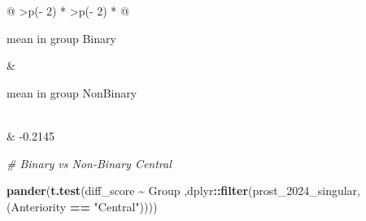 \documentclass[
]{article}
\newenvironment{Shaded}{\begin{snugshade}}{\end{snugshade}}
\newcommand{\CommentTok}[1]{\textcolor[rgb]{0.56,0.35,0.01}{\textit{#1}}}
\newcommand{\FunctionTok}[1]{\textcolor[rgb]{0.13,0.29,0.53}{\textbf{#1}}}
\newcommand{\NormalTok}[1]{#1}
\newcommand{\SpecialCharTok}[1]{\textcolor[rgb]{0.81,0.36,0.00}{\textbf{#1}}}
\newcommand{\StringTok}[1]{\textcolor[rgb]{0.31,0.60,0.02}{#1}}
\begin{document}
\begin{longtable}[]{@{}
  >{\centering\arraybackslash}p{(\columnwidth - 2\tabcolsep) * }
  >{\centering\arraybackslash}p{(\columnwidth - 2\tabcolsep) * }@{}}
\toprule\noalign{}
\begin{minipage}[b]{\linewidth}\centering
mean in group Binary
\end{minipage} & \begin{minipage}[b]{\linewidth}\centering
mean in group NonBinary
\end{minipage} \\
\midrule\noalign{}
\endhead
\bottomrule\noalign{}
 & -0.2145 \\
\end{longtable}

\begin{Shaded}
\begin{Highlighting}[]
\CommentTok{\# Binary vs Non{-}Binary Central}

\FunctionTok{pander}\NormalTok{(}\FunctionTok{t.test}\NormalTok{(diff\_score }\SpecialCharTok{\textasciitilde{}}\NormalTok{ Group}
\NormalTok{       ,dplyr}\SpecialCharTok{::}\FunctionTok{filter}\NormalTok{(prost\_2024\_singular, (Anteriority }\SpecialCharTok{==} \StringTok{"Central"}\NormalTok{))))}
\end{Highlighting}
\end{Shaded}
\end{document}
